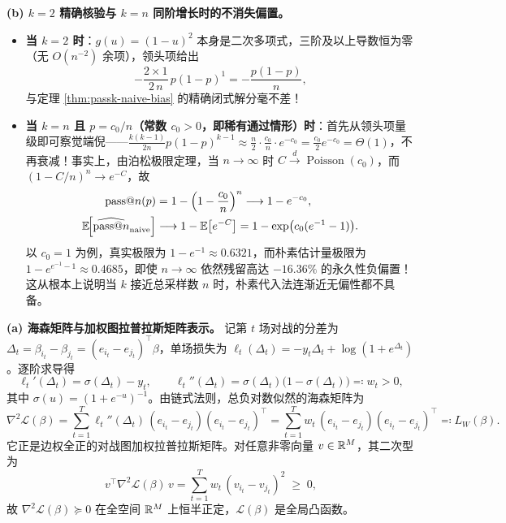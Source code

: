 \textbf{(b) $k = 2$ 精确核验与 $k = n$ 同阶增长时的不消失偏置。}
\begin{itemize}
  \item \textbf{当 $k = 2$ 时}：$g(u) = (1 - u)^2$ 本身是二次多项式，三阶及以上导数恒为零（无 $O(n^{-2})$ 余项），领头项给出
  \[
    -\frac{2 \times 1}{2\,n}\,p(1 - p)^{1} = -\frac{p(1 - p)}{n},
  \]
  与定理 \ref{thm:passk-naive-bias} 的精确闭式解分毫不差！
  \item \textbf{当 $k = n$ 且 $p = c_0 / n$（常数 $c_0 > 0$，即稀有通过情形）时}：首先从领头项量级即可察觉端倪——$\frac{k(k-1)}{2n}p(1-p)^{k-1} \approx \frac{n}{2}\cdot\frac{c_0}{n}\cdot e^{-c_0} = \frac{c_0}{2}e^{-c_0} = \Theta(1)$，不再衰减！事实上，由泊松极限定理，当 $n \to \infty$ 时 $C \xrightarrow{d} \operatorname{Poisson}(c_0)$，而 $(1 - C/n)^n \to e^{-C}$，故
  \begin{align*}
    \mathrm{pass@}n(p) &= 1 - \left(1 - \frac{c_0}{n}\right)^n \longrightarrow 1 - e^{-c_0}, \\
    \mathbb{E}\!\Big[\widehat{\mathrm{pass@}n}_{\text{naive}}\Big]
    &\longrightarrow 1 - \mathbb{E}\!\left[e^{-C}\right]
     = 1 - \exp\!\big(c_0(e^{-1} - 1)\big).
  \end{align*}
  以 $c_0 = 1$ 为例，真实极限为 $1 - e^{-1} \approx 0.6321$，而朴素估计量极限为 $1 - e^{e^{-1}-1} \approx 0.4685$，即使 $n \to \infty$ 依然残留高达 $\mathbf{-16.36\%}$ 的永久性负偏置！这从根本上说明当 $k$ 接近总采样数 $n$ 时，朴素代入法连渐近无偏性都不具备。
\end{itemize}


\textbf{(a) 海森矩阵与加权图拉普拉斯矩阵表示。}
记第 $t$ 场对战的分差为 $\Delta_t = \beta_{i_t} - \beta_{j_t} = (e_{i_t} - e_{j_t})^\top \beta$，单场损失为 $\ell_t(\Delta_t) = -y_t \Delta_t + \log(1 + e^{\Delta_t})$。逐阶求导得
\[
  \ell_t'(\Delta_t) = \sigma(\Delta_t) - y_t, \qquad
  \ell_t''(\Delta_t) = \sigma(\Delta_t)\big(1 - \sigma(\Delta_t)\big) \eqqcolon w_t > 0,
\]
其中 $\sigma(u) = (1 + e^{-u})^{-1}$。由链式法则，总负对数似然的海森矩阵为
\[
  \nabla^2 \mathcal{L}(\beta)
  = \sum_{t=1}^T \ell_t''(\Delta_t)\,(e_{i_t} - e_{j_t})(e_{i_t} - e_{j_t})^\top
  = \sum_{t=1}^T w_t\,(e_{i_t} - e_{j_t})(e_{i_t} - e_{j_t})^\top
  \eqqcolon L_W(\beta).
\]
它正是边权全正的对战图加权拉普拉斯矩阵。对任意非零向量 $v \in \mathbb{R}^M$，其二次型为
\[
  v^\top \nabla^2 \mathcal{L}(\beta)\,v
  = \sum_{t=1}^T w_t\,(v_{i_t} - v_{j_t})^2 \;\ge\; 0,
\]
故 $\nabla^2 \mathcal{L}(\beta) \succeq 0$ 在全空间 $\mathbb{R}^M$ 上恒半正定，$\mathcal{L}(\beta)$ 是全局凸函数。

